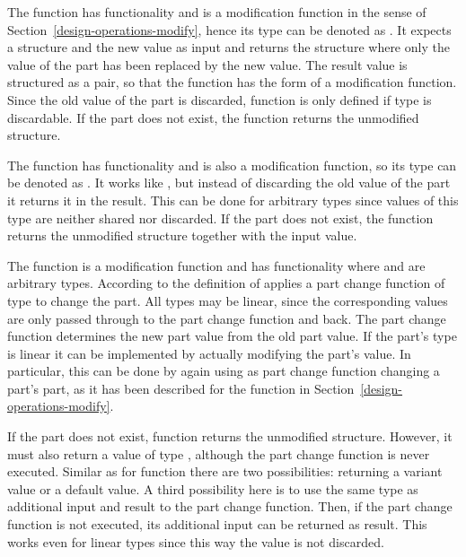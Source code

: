 The function  has functionality  and is a modification function in the sense of 
Section~\ref{design-operations-modify}, hence its type can be denoted as . 
It expects a structure and the new value as input
and returns the structure where only the value of the part has been replaced by the new value. The result value is 
structured as a pair, so that the function has the form of a modification function. Since the old
value of the part is discarded, function  is only defined if type  is discardable.
If the part does not exist, the function returns the unmodified structure.

The function  has functionality  and is also a modification function, so its type
can be denoted as . It works like , but instead of
discarding the old value of the part it returns it in the result. This can be done for arbitrary types 
since values of this type are neither shared nor discarded. If the part does not exist, the function returns
the unmodified structure together with the input value.

The function  is a modification function and has functionality  where 
 and  are arbitrary types.
According to the definition of   applies a part change function of
type  to change the part. All types may be linear, since the corresponding values are
only passed through to the part change function and back.
The part change function determines the new part value from the old part value. If the part's type 
is linear it can be implemented by actually modifying the part's value. In particular, this can be done by
again using  as part change function changing a part's part, as it has been described
for the  function in Section~\ref{design-operations-modify}.

If the part does not exist, function  returns the unmodified structure. However, it must also
return a value of type , although the part change function is never executed. Similar as for 
function  there are two possibilities: returning a variant value or a default value. A third
possibility here is to use the same type  as additional input and result to the part change
function. Then, if the part change function is not executed, its additional input can be returned
as result. This works even for linear types  since this way the value is not discarded.

